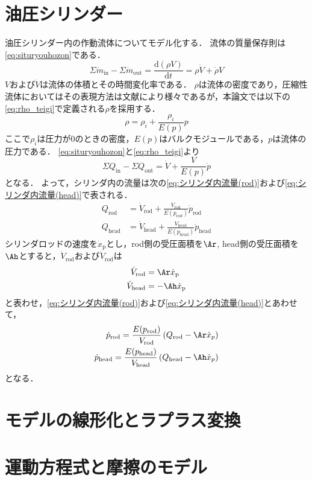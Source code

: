\section{油圧シリンダー}
油圧シリンダー内の作動流体についてモデル化する．
流体の質量保存則は\eqnname\ref{eq:situryouhozon}である．
\begin{equation}
    \label{eq:situryouhozon}
\Sigma \dot{m}_{\mathrm{in}}-\Sigma \dot{m}_{\mathrm{out}} = \frac{\mathrm{d}(\rho V)}{\mathrm{d}t} = \rho \dot{V}+\dot{\rho}V
\end{equation}
$V$および$\dot{V}$は流体の体積とその時間変化率である．
$\rho$は流体の密度であり，圧縮性流体においてはその表現方法は文献により様々であるが，本論文では以下の\eqnname\ref{eq:rho_teigi}で定義される$\rho$を採用する．
\begin{equation}
    \label{eq:rho_teigi}
    \rho = \rho_i + \frac{\rho_i}{E(p)}p
\end{equation}
ここで$\rho_i$は圧力が0のときの密度，$E(p)$はバルクモジュールである，$p$は流体の圧力である．
\eqnname\ref{eq:situryouhozon}と\eqnname\ref{eq:rho_teigi}より
\begin{equation}
    \label{eq:流量保存}
    \Sigma Q_{\mathrm{in}} - \Sigma Q_{\mathrm{out}} = \dot{V} + \frac{V}{E(p)}\dot{p}
\end{equation}
となる．
よって，シリンダ内の流量は次の\eqnname\ref{eq:シリンダ内流量(rod)}および\eqnname\ref{eq:シリンダ内流量(head)}で表される．
\begin{align}
    \label{eq:シリンダ内流量(rod)}
    Q_{\mathrm{rod}}& = \dot{V}_\mathrm{rod} + \frac{V_\mathrm{rod}}{E(p_\mathrm{rod})}\dot{p}_\mathrm{rod}\\
    \label{eq:シリンダ内流量(head)}
    Q_{\mathrm{head}} &= \dot{V}_\mathrm{head} + \frac{V_\mathrm{head}}{E(p_\mathrm{head})}\dot{p}_\mathrm{head}
\end{align}
シリンダロッドの速度を$\dot{x}_\mathrm{p}$とし，rod側の受圧面積を$\Ar$,
head側の受圧面積を$\Ah$とすると，$\dot{V}_\mathrm{rod}$および$\dot{V}_\mathrm{rod}$は
\begin{align}
    \label{eq:dotVrod}
    \dot{V}_\mathrm{rod} &= \Ar \dot{x}_\mathrm{p} \\
    \label{eq:dotVhead}
    \dot{V}_\mathrm{head} &= -\Ah \dot{x}_\mathrm{p} 
\end{align}
と表わせ，\eqnname\ref{eq:シリンダ内流量(rod)}および\eqnname\ref{eq:シリンダ内流量(head)}とあわせて，
\begin{align}
    \label{eq:dp_rod}
    \dot{p}_\mathrm{rod}=\frac{E(p_\mathrm{rod})}{V_\mathrm{rod}}\left( Q_\mathrm{rod} - \Ar \dot{x}_p\right)\\
    \label{eq:dp_head}
    \dot{p}_\mathrm{head}=\frac{E(p_\mathrm{head})}{V_\mathrm{head}}\left( Q_\mathrm{head} - \Ah \dot{x}_p\right)
\end{align}
となる．

\section{モデルの線形化とラプラス変換}

\section{運動方程式と摩擦のモデル}